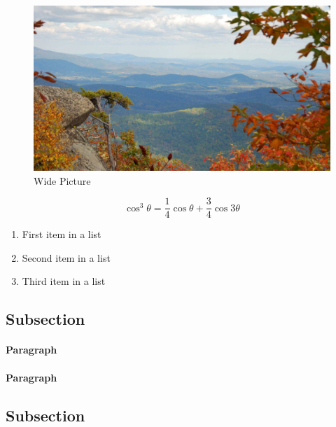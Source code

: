\begin{figure}[ht]\centering %
\includegraphics[width=\linewidth]{view}
\caption{Wide Picture}
\label{fig:view}
\end{figure}



\begin{equation}
\cos^3 \theta =\frac{1}{4}\cos\theta+\frac{3}{4}\cos 3\theta
\label{eq:refname2}
\end{equation}



\begin{enumerate}[noitemsep] %
\item First item in a list
\item Second item in a list
\item Third item in a list
\end{enumerate}

\subsection{Subsection}

\lipsum[6] %

\paragraph{Paragraph} \lipsum[7] %
\paragraph{Paragraph} \lipsum[8] %

\subsection{Subsection}

